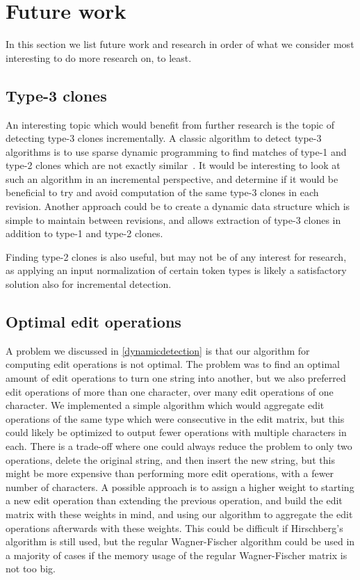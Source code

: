 \section{Future work}

In this section we list future work and research in order of what we consider
most interesting to do more research on, to least.

\subsection*{Type-3 clones}

An interesting topic which would benefit from further research is the topic of detecting
type-3 clones incrementally. A classic algorithm to detect type-3 algorithms is to use
sparse dynamic programming to find matches of type-1 and type-2 clones which are not
exactly similar~\cite{BakerSparseDynamicProgramming}. It would be interesting to look at
such an algorithm in an incremental perspective, and determine if it would be beneficial
to try and avoid computation of the same type-3 clones in each revision. Another approach
could be to create a dynamic data structure which is simple to maintain between revisions,
and allows extraction of type-3 clones in addition to type-1 and type-2 clones. 

Finding type-2 clones is also useful, but may not be of any interest for research, as
applying an input normalization of certain token types is likely a satisfactory solution
also for incremental detection.

\subsection*{Optimal edit operations}

A problem we discussed in \cref{dynamicdetection} is that our algorithm for computing edit
operations is not optimal. The problem was to find an optimal amount of edit operations to
turn one string into another, but we also preferred edit operations of more than one
character, over many edit operations of one character. We implemented a simple algorithm
which would aggregate edit operations of the same type which were consecutive in the edit
matrix, but this could likely be optimized to output fewer operations with multiple
characters in each. There is a trade-off where one could always reduce the problem to only
two operations, delete the original string, and then insert the new string, but this might
be more expensive than performing more edit operations, with a fewer number of characters.
A possible approach is to assign a higher weight to starting a new edit operation than
extending the previous operation, and build the edit matrix with these weights in mind,
and using our algorithm to aggregate the edit operations afterwards with these weights.
This could be difficult if Hirschberg's algorithm is still used, but the regular
Wagner-Fischer algorithm could be used in a majority of cases if the memory usage of the
regular Wagner-Fischer matrix is not too big.


